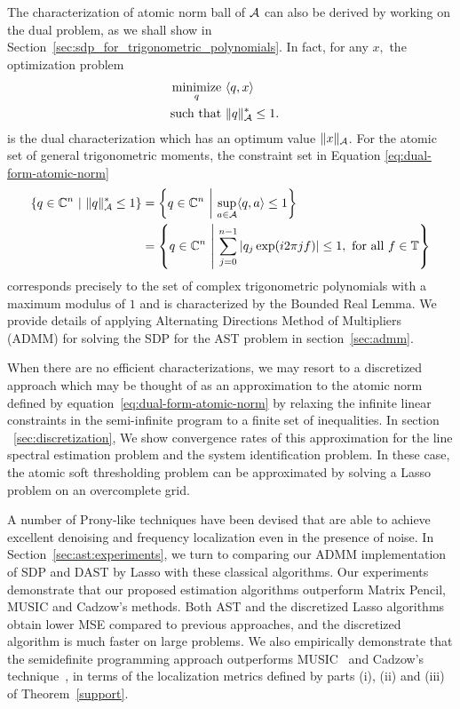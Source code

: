 The characterization of atomic norm ball of $\mathcal{A}$ can also be derived by working
on the dual problem, as we shall show in
Section~\ref{sec:sdp_for_trigonometric_polynomials}. In fact, for any $x,$ the
optimization problem
\begin{equation}
	\label{eq:dual-form-atomic-norm}
	\begin{aligned}
		\mathop{\operatorname{minimize}}_q~ & \langle q, x\rangle &&\\
		\text{such that } & \lVert q\rVert_{\mathcal{A}}^*	 \leq 1.	&&
	\end{aligned}
\end{equation}
is the dual characterization which has an optimum value $\lVert x\rVert_{\mathcal{A}}$. For the atomic set of general trigonometric moments, the constraint set in Equation \eqref{eq:dual-form-atomic-norm}
\begin{align}
	\left\{ q \in \mathbb{C}^n ~\middle|~ \lVert q\rVert_{\mathcal{A}}^* \leq 1 \right\} &
	= \left\{ q \in \mathbb{C}^n ~\middle|~ \sup_{a \in \mathcal{A}}\langle q, a\rangle \leq 1 \right\} \\
	&= \left\{ q \in \mathbb{C}^n ~\middle|~ \sum_{j=0}^{n-1}{|q_j \exp(i 2\pi j f)|} \leq 1, \text{ for all } f \in \mathbb{T} \right\}
\end{align}
corresponds precisely to the set of complex trigonometric polynomials with a
maximum modulus of $1$ and is characterized by the Bounded Real Lemma. We
provide details of applying Alternating Directions Method of Multipliers (ADMM)
for solving the SDP for the AST problem in section~\ref{sec:admm}.

When there are no efficient characterizations, we may resort to a discretized
approach which may be thought of as an approximation to the atomic norm defined
by equation~\eqref{eq:dual-form-atomic-norm} by relaxing the infinite linear
constraints in the semi-infinite program to a finite set of inequalities. In
section ~\ref{sec:discretization}, We show convergence rates of this
approximation for the line spectral estimation problem and the system
identification problem. In these case, the atomic soft thresholding problem can
be approximated by solving a Lasso problem on an overcomplete grid.

A number of Prony-like techniques have been devised that are able to achieve
excellent denoising and frequency localization even in the presence of noise. In
Section~\ref{sec:ast:experiments}, we turn to comparing our ADMM implementation
of SDP and DAST by Lasso with these classical algorithms. Our experiments
demonstrate that our proposed estimation algorithms outperform Matrix Pencil,
MUSIC and Cadzow's methods. Both AST and the discretized Lasso algorithms obtain
lower MSE compared to previous approaches, and the discretized algorithm is much
faster on large problems. We also empirically demonstrate that the semidefinite
programming approach outperforms MUSIC~\cite{music} and Cadzow's
technique~\cite{cadzow05}, in terms of the localization metrics defined by parts
(i), (ii) and (iii) of Theorem~\ref{support}.

